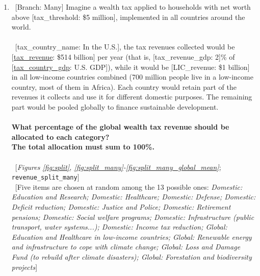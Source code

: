 \begin{enumerate}[resume]
\item ~[Branch: Many] \label{q:revenue_split_many} Imagine a wealth tax applied to households with net worth above [tax\_threshold: \$5 million], implemented in all countries around the world.
~\\\\ 
~[tax\_country\_name: In the U.S.], the tax revenues collected would be [\hyperlink{tab_features}{tax\_revenue}: \$514 billion] per year (that is, [tax\_revenue\_gdp: 2]\% of [\hyperlink{tab_features}{tax\_country\_gdp}: U.S. GDP]), while it would be [LIC\_revenue: \$1 billion] in all low-income countries combined (700 million people live in a low-income country, most of them in Africa).
Each country would retain part of the revenues it collects and use it for different domestic purposes. The remaining part would be pooled globally to finance sustainable development.
~\\\\\textbf{What percentage of the global wealth tax revenue should be allocated to each category?}~\\\textbf{The total allocation must sum to
100\%.}\\\\ 
~[\textit{Figures \ref{fig:split}, \ref{fig:split_many}-\ref{fig:split_many_global_mean}}; 
\verb|revenue_split_many|]
  \\ ~[Five items are chosen at random among the 13 possible ones: \textit{Domestic: Education and Research; Domestic: Healthcare; Domestic: Defense; Domestic: Deficit reduction; Domestic: Justice and Police; Domestic: Retirement pensions; Domestic: Social welfare programs; Domestic: Infrastructure (public transport, water systems...); Domestic: Income tax reduction; Global: Education and Healthcare in low-income countries; Global: Renewable energy and infrastructure to cope with climate change; Global: Loss and Damage Fund (to rebuild after climate disasters); Global: Forestation and biodiversity projects}]


\end{enumerate} 

